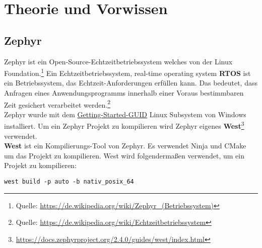 \newpage
\section{Theorie und Vorwissen}
\subsection{Zephyr}
    Zephyr ist ein Open-Source-Echtzeitbetriebssystem welches von der Linux Foundation.\footnote{Quelle: \url{https://de.wikipedia.org/wiki/Zephyr_(Betriebssystem)}}
    Ein Echtzeitbetriebssystem, real-time operating system \textbf{RTOS} ist ein Betriebssystem, das Echtzeit-Anforderungen erfüllen kann. 
    Das bedeutet, dass Anfragen eines Anwendungsprogramms innerhalb einer Voraus bestimmbaren Zeit gesichert verarbeitet werden.\footnote{Quelle: \url{https://de.wikipedia.org/wiki/Echtzeitbetriebssystem}}
    \\
    Zephyr wurde mit dem \href{https://docs.zephyrproject.org/latest/getting_started/index.html}{Getting-Started-GUID} Linux Subsystem von Windows installiert. 
    Um ein Zephyr Projekt zu kompilieren wird Zephyr eigenes \textbf{West}\footnote{\url{https://docs.zephyrproject.org/2.4.0/guides/west/index.html}} verwendet.\\
    \textbf{West} ist ein Kompilierungs-Tool von Zephyr. Es verwendet Ninja und CMake um das Projekt zu kompilieren. 
    West wird folgendermaßen verwendet, um ein Projekt zu kompilieren: 
    \begin{lstlisting}[style=StyleC, captionpos=b, caption=West Beispiel, label=West Beispiel]
west build -p auto -b nativ_posix_64 
    \end{lstlisting}

\newpage
